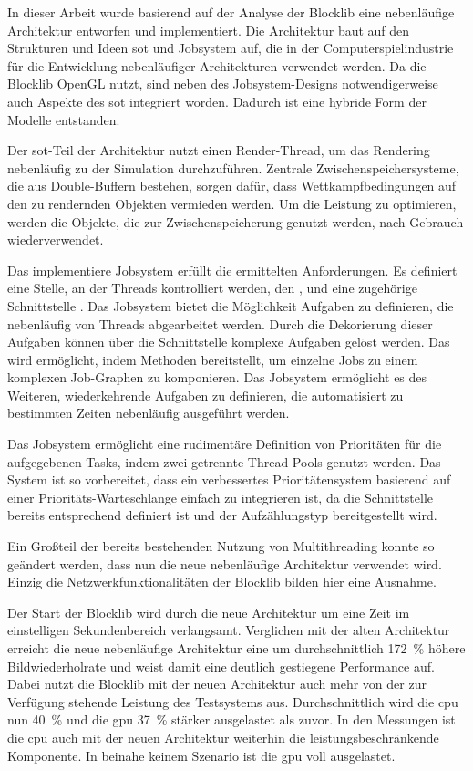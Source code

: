 In dieser Arbeit wurde basierend auf der Analyse der Blocklib eine nebenläufige Architektur entworfen und implementiert. Die Architektur baut auf den Strukturen und Ideen \acf{sot} und Jobsystem auf, die in der Computerspielindustrie für die Entwicklung nebenläufiger Architekturen verwendet werden. Da die Blocklib OpenGL nutzt, sind neben des Jobsystem-Designs notwendigerweise auch Aspekte des \ac{sot} integriert worden. Dadurch ist eine hybride Form der Modelle entstanden.

Der \ac{sot}-Teil der Architektur nutzt einen Render-Thread, um das Rendering nebenläufig zu der Simulation durchzuführen. Zentrale Zwischenspeichersysteme, die aus Double-Buffern bestehen, sorgen dafür, dass Wettkampfbedingungen auf den zu rendernden Objekten vermieden werden. Um die Leistung zu optimieren, werden die Objekte, die zur Zwischenspeicherung genutzt werden, nach Gebrauch wiederverwendet.

Das implementiere Jobsystem erfüllt die ermittelten Anforderungen. Es definiert eine Stelle, an der Threads kontrolliert werden, den , und eine zugehörige Schnittstelle . Das Jobsystem bietet die Möglichkeit Aufgaben zu definieren, die nebenläufig von Threads abgearbeitet werden. Durch die Dekorierung dieser Aufgaben können über die Schnittstelle  komplexe Aufgaben gelöst werden. Das wird ermöglicht, indem  Methoden bereitstellt, um einzelne Jobs zu einem komplexen Job-Graphen zu komponieren. Das Jobsystem ermöglicht es des Weiteren, wiederkehrende Aufgaben zu definieren, die automatisiert zu bestimmten Zeiten nebenläufig ausgeführt werden.

Das Jobsystem ermöglicht eine rudimentäre Definition von Prioritäten für die aufgegebenen Tasks, indem zwei getrennte Thread-Pools genutzt werden. Das System ist so vorbereitet, dass ein verbessertes Prioritätensystem basierend auf einer Prioritäts-Warteschlange einfach zu integrieren ist, da die Schnittstelle  bereits entsprechend definiert ist und der Aufzählungstyp  bereitgestellt wird.

Ein Großteil der bereits bestehenden Nutzung von Multithreading konnte so geändert werden, dass nun die neue nebenläufige Architektur verwendet wird. Einzig die Netzwerkfunktionalitäten der Blocklib bilden hier eine Ausnahme.

Der Start der Blocklib wird durch die neue Architektur um eine Zeit im einstelligen Sekundenbereich verlangsamt. Verglichen mit der alten Architektur erreicht die neue nebenläufige Architektur eine um durchschnittlich \SI{172}{\percent} höhere Bildwiederholrate und weist damit eine deutlich gestiegene Performance auf. Dabei nutzt die Blocklib mit der neuen Architektur auch mehr von der zur Verfügung stehende Leistung des Testsystems aus. Durchschnittlich wird die \ac{cpu} nun \SI{40}{\percent} und die \ac{gpu} \SI{37}{\percent} stärker ausgelastet als zuvor. In den Messungen ist die \ac{cpu} auch mit der neuen Architektur weiterhin die leistungsbeschränkende Komponente. In beinahe keinem Szenario ist die \ac{gpu} voll ausgelastet.
